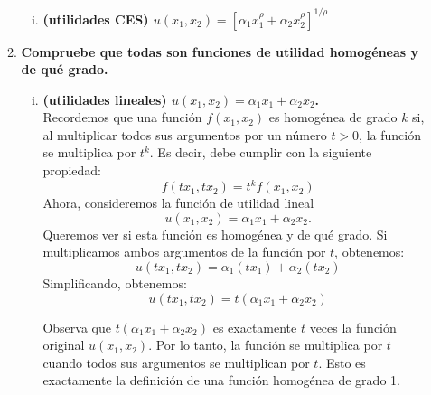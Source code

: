 \begin{enumerate}
\begin{enumerate}[\bfseries a)]
\begin{enumerate}[i)]
		\item \textbf{\boldmath (utilidades CES) $u(x_1,x_2)=\left[\alpha_1 x_1^{\rho}+\alpha_2 x_2^{\rho}\right]^{1/\rho}$}\\
		    \begin{center}
		    \end{center}
	    \end{enumerate}
	    \vspace{.5cm}

	    \item \textbf{Compruebe que todas son funciones de utilidad homogéneas y de qué grado.}\\

	    \begin{enumerate}[i)]

		\item \textbf{\boldmath (utilidades lineales) $u(x_1,x_2)=\alpha_1x_1+\alpha_2x_2$.}\\

		    Recordemos que una función $f(x_1, x_2)$ es homogénea de grado $k$ si, al multiplicar todos sus argumentos por un número $t > 0$, la función se multiplica por $t^k$. Es decir, debe cumplir con la siguiente propiedad:
		    $$f(tx_1, tx_2) = t^kf(x_1, x_2)$$
		    Ahora, consideremos la función de utilidad lineal 
		    $$u(x_1,x_2)=\alpha_1x_1+\alpha_2x_2.$$ 
		    Queremos ver si esta función es homogénea y de qué grado. Si multiplicamos ambos argumentos de la función por $t$, obtenemos:
		    $$u(tx_1, tx_2) = \alpha_1(tx_1) + \alpha_2(tx_2)$$
		    Simplificando, obtenemos:
		    $$u(tx_1, tx_2) = t(\alpha_1x_1 + \alpha_2x_2)$$

		    Observa que $t(\alpha_1x_1 + \alpha_2x_2)$ es exactamente $t$ veces la función original $u(x_1, x_2)$. Por lo tanto, la función se multiplica por $t$ cuando todos sus argumentos se multiplican por $t$. Esto es exactamente la definición de una función homogénea de grado 1.\\


\end{enumerate}
\end{enumerate}
\end{enumerate}
